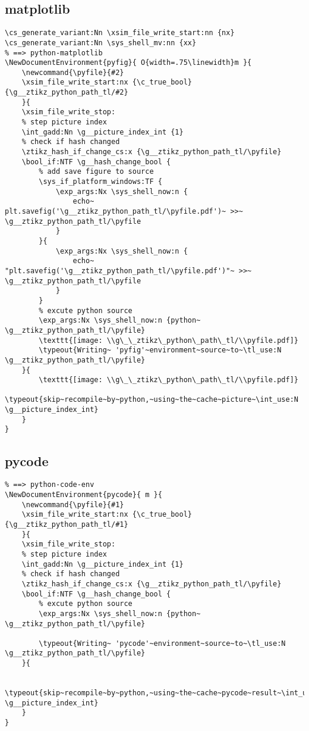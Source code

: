 \subsection{matplotlib}
\begin{verbatim}
\cs_generate_variant:Nn \xsim_file_write_start:nn {nx}
\cs_generate_variant:Nn \sys_shell_mv:nn {xx}
% ==> python-matplotlib
\NewDocumentEnvironment{pyfig}{ O{width=.75\linewidth}m }{
    \newcommand{\pyfile}{#2}
    \xsim_file_write_start:nx {\c_true_bool}{\g__ztikz_python_path_tl/#2}
    }{ 
    \xsim_file_write_stop:
    % step picture index
    \int_gadd:Nn \g__picture_index_int {1}   
    % check if hash changed
    \ztikz_hash_if_change_cs:x {\g__ztikz_python_path_tl/\pyfile}   
    \bool_if:NTF \g__hash_change_bool {
        % add save figure to source
        \sys_if_platform_windows:TF {
            \exp_args:Nx \sys_shell_now:n {
                echo~ plt.savefig('\g__ztikz_python_path_tl/\pyfile.pdf')~ >>~ \g__ztikz_python_path_tl/\pyfile
            }
        }{
            \exp_args:Nx \sys_shell_now:n {
                echo~ "plt.savefig('\g__ztikz_python_path_tl/\pyfile.pdf')"~ >>~ \g__ztikz_python_path_tl/\pyfile
            }
        }
        % excute python source
        \exp_args:Nx \sys_shell_now:n {python~ \g__ztikz_python_path_tl/\pyfile} 
        \texttt{[image: \\g\_\_ztikz\_python\_path\_tl/\\pyfile.pdf]}
        \typeout{Writing~ 'pyfig'~environment~source~to~\tl_use:N \g__ztikz_python_path_tl/\pyfile}
    }{
        \texttt{[image: \\g\_\_ztikz\_python\_path\_tl/\\pyfile.pdf]}
        \typeout{skip~recompile~by~python,~using~the~cache~picture~\int_use:N \g__picture_index_int}
    }
}    
\end{verbatim}

\subsection{pycode}
\begin{verbatim}
% ==> python-code-env
\NewDocumentEnvironment{pycode}{ m }{
    \newcommand{\pyfile}{#1}
    \xsim_file_write_start:nx {\c_true_bool}{\g__ztikz_python_path_tl/#1}
    }{ 
    \xsim_file_write_stop:
    % step picture index
    \int_gadd:Nn \g__picture_index_int {1}   
    % check if hash changed
    \ztikz_hash_if_change_cs:x {\g__ztikz_python_path_tl/\pyfile}   
    \bool_if:NTF \g__hash_change_bool {
        % excute python source
        \exp_args:Nx \sys_shell_now:n {python~ \g__ztikz_python_path_tl/\pyfile} 
        
        \typeout{Writing~ 'pycode'~environment~source~to~\tl_use:N \g__ztikz_python_path_tl/\pyfile}
    }{
        
        \typeout{skip~recompile~by~python,~using~the~cache~pycode~result~\int_use:N \g__picture_index_int}
    }
}
\end{verbatim}

